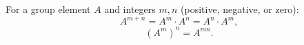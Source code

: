 For a group element $A$ and integers $m, n$ (positive, negative, or zero):
$$A^{m+n} = A^m \cdot A^n = A^n \cdot A^m,$$
$$(A^m)^n = A^{mn}.$$
